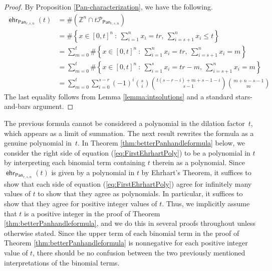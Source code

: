 \documentclass[11pt]{amsart}
\theoremstyle{definition}
\newcommand{\0}{\emptyset}
\newcommand{\Po}{\mathcal{P}}
\DeclareMathOperator{\ehr}{\mathsf{ehr}}
\DeclareMathOperator{\Pan}{\mathsf{Pan}} %
\newcommand{\JLM}[1]{\par \noindent
  \framebox{\begin{minipage}[c]{0.95 \textwidth}\color{blue} Jeremy Note:
      #1 \end{minipage}\color{blue}}\par}
\begin{document}
\begin{proof}
By Proposition \ref{Pan-characterization}, we have the following.
\begin{align*}
\ehr_{{\Pan_{r,s,n}}}(t)&=\#(\mathbb{Z}^n\cap t\Po_{\Pan_{r,s,n}})\\
&=\#\left\{x\in [0,t]^n\ :\ \sum_{i=1}^n x_i =tr,\ \sum_{i=s+1}^n x_i\leq t\right\}\\
&=\sum_{m=0}^t \#\left\{x\in [0,t]^n\ :\ \sum_{i=1}^n x_i =tr,\ \sum_{i=s+1}^n x_i=m\right\}\\
&=\sum_{m=0}^t \#\left\{x\in [0,t]^n\ :\ \sum_{i=1}^{s} x_i =tr-m,\ \sum_{i=s+1}^n x_i=m\right\}\\
&=\sum_{m=0}^t\sum_{i=0}^{s-r}(-1)^i\binom{s}{i}\binom{t(s-r-i)+m+s-1-i}{s-1}\binom{m+n-s-1}{m}
\end{align*}
The last equality follows from Lemma \ref{lemma:intsolutions} and a standard stars-and-bars argument.
\end{proof}

The previous formula cannot be considered a polynomial in the dilation factor~$t$, which appears as a limit of summation.  
The next result rewrites the formula as a genuine polynomial in~$t$. 
In Theorem \ref{thm:betterPanhandleformula} below, we consider the right side of equation (\ref{eq:FirstEhrhartPoly}) to be a polynomial in $t$ by interpreting each binomial term containing $t$ therein as a polynomial.
Since $\ehr_{{\Pan_{r,s,n}}}(t)$ is given by a polynomial in $t$ by Ehrhart's Theorem, it suffices to show that each side of equation (\ref{eq:FirstEhrhartPoly}) agree for infinitely many values of $t$ to show that they agree as polynomials. In particular, it suffices to show that they agree for positive integer values of $t$.
Thus, we implicitly assume that $t$ is a positive integer in the proof of Theorem \ref{thm:betterPanhandleformula}, and we do this in several proofs throughout unless otherwise stated. 
Since the upper term of each binomial term in the proof of Theorem \ref{thm:betterPanhandleformula} is nonnegative for each positive integer value of $t$, there should be no confusion between the two previously mentioned interpretations of the binomial terms.


\end{document}
